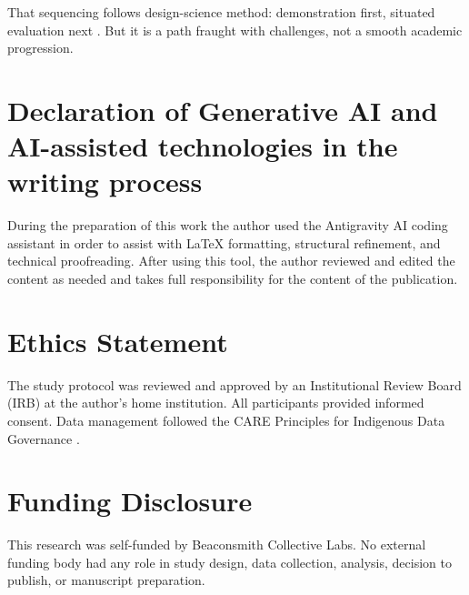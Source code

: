 \documentclass[review,onecolumn]{elsarticle}
\begin{document}
That sequencing follows design-science method: demonstration first, situated evaluation next \cite{hevner2004, dresch2015}. But it is a path fraught with challenges, not a smooth academic progression.

\section*{Declaration of Generative AI and AI-assisted technologies in the writing process}

During the preparation of this work the author used the Antigravity AI coding assistant in order to assist with LaTeX formatting, structural refinement, and technical proofreading. After using this tool, the author reviewed and edited the content as needed and takes full responsibility for the content of the publication.

\section*{Ethics Statement}

The study protocol was reviewed and approved by an Institutional Review Board (IRB) at the author's home institution. All participants provided informed consent. Data management followed the CARE Principles for Indigenous Data Governance \cite{carroll2020}.

\section*{Funding Disclosure}

This research was self-funded by Beaconsmith Collective Labs. No external funding body had any role in study design, data collection, analysis, decision to publish, or manuscript preparation.
\end{document}
